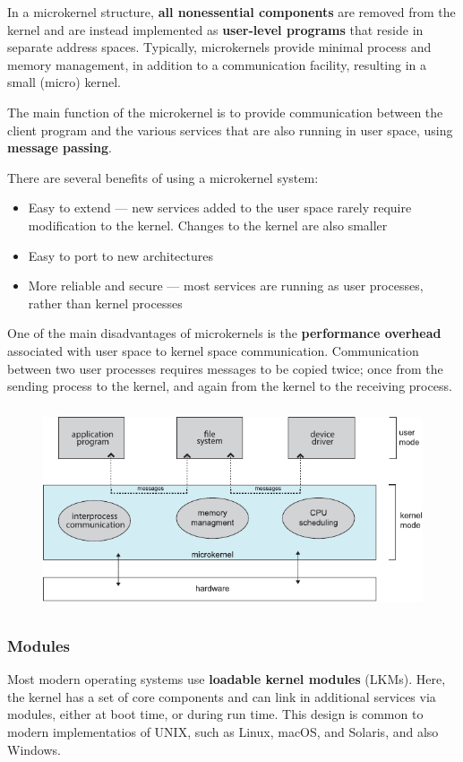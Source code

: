 \documentclass{article}
\begin{document}
In a microkernel structure, \textbf{all nonessential components} are
removed from the kernel and are instead implemented as
\textbf{user-level programs} that reside in separate address spaces.
Typically, microkernels provide minimal process and memory management,
in addition to a communication facility, resulting in a small (micro)
kernel.

The main function of the microkernel is to provide communication
between the client program and the various services that are also
running in user space, using \textbf{message passing}.

There are several benefits of using a microkernel system:
\begin{itemize}
    \item Easy to extend --- new services added to the user space
          rarely require modification to the kernel. Changes to the
          kernel are also smaller
    \item Easy to port to new architectures
    \item More reliable and secure --- most services are running as
          user processes, rather than kernel processes
\end{itemize}
One of the main disadvantages of
microkernels is the \textbf{performance overhead} associated
with user space to kernel space communication.
Communication between two user processes requires messages to be copied
twice; once from the sending process to the kernel, and again from the
kernel to the receiving process.
\begin{figure}[H]
    \centering
    \includegraphics[height = 6cm]{figures/microkernel_structure.pdf}
\end{figure}
\subsubsection{Modules}
Most modern operating systems use \textbf{loadable kernel modules}
(LKMs). Here, the kernel has a set of core components and can link in
additional services via modules, either at boot time, or during run
time. This design is common to modern implementatios of UNIX, such as
Linux, macOS, and Solaris, and also Windows.
\end{document}
